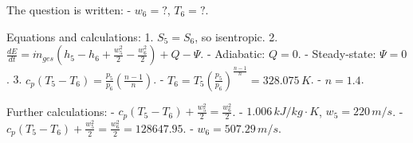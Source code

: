 The question is written:  
- \( w_6 = ? \), \( T_6 = ? \).  

Equations and calculations:  
1. \( S_5 = S_6 \), so isentropic.  
2. \( \frac{dE}{dt} = \dot{m}_{ges} \left( h_5 - h_6 + \frac{w_5^2}{2} - \frac{w_6^2}{2} \right) + Q - \Psi \).  
   - Adiabatic: \( Q = 0 \).  
   - Steady-state: \( \Psi = 0 \).  
3. \( c_p (T_5 - T_6) = \frac{p_5}{p_6} \left( \frac{n-1}{n} \right) \).  
   - \( T_6 = T_5 \left( \frac{p_5}{p_6} \right)^{\frac{n-1}{n}} = 328.075 \, K \).  
   - \( n = 1.4 \).  

Further calculations:  
- \( c_p (T_5 - T_6) + \frac{w_5^2}{2} = \frac{w_6^2}{2} \).  
- \( 1.006 \, kJ/kg·K \), \( w_5 = 220 \, m/s \).  
- \( c_p (T_5 - T_6) + \frac{w_5^2}{2} = \frac{w_6^2}{2} = 128647.95 \).  
- \( w_6 = 507.29 \, m/s \).